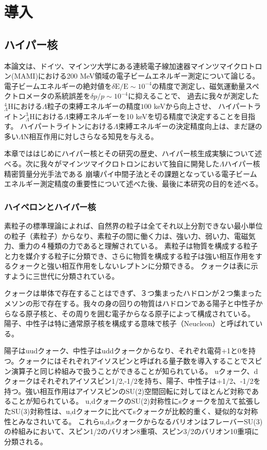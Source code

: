 \documentclass[a4paper,11pt,uplatex]{jsbook}
\begin{document}
\chapter{導入}
\section{ハイパー核}
本論文は、ドイツ、マインツ大学にある連続電子線加速器マインツマイクロトロン(MAMI)における200 MeV領域の電子ビームエネルギー測定について論じる。
電子ビームエネルギーの絶対値を$\delta \text{E}/\text{E} \sim 10^{-4}$の精度で測定し、磁気運動量スペクトロメータの系統誤差を$\delta p/p \sim 10^{-4}$に抑えることで、
過去に我々が測定した$^4_{\Lambda} \text{H}$における$\Lambda$粒子の束縛エネルギーの精度$100$ keVから向上させ、
ハイパートライトン$^3_{\Lambda}\text{H}$における$\Lambda$束縛エネルギーを10 keVを切る精度で決定することを目指す。
ハイパートライトンにおける$\Lambda$束縛エネルギーの決定精度向上は、まだ謎の多い$\Lambda$N相互作用に対しさらなる知見を与える。

本章でははじめにハイパー核とその研究の歴史、ハイパー核生成実験について述べる。次に我々がマインツマイクロトロンにおいて独自に開発した$\Lambda$ハイパー核精密質量分光手法である
崩壊パイ中間子法とその課題となっている電子ビームエネルギー測定精度の重要性について述べた後、最後に本研究の目的を述べる。

\subsection{ハイペロンとハイパー核}
素粒子の標準理論によれば、自然界の粒子は全てそれ以上分割できない最小単位の粒子（素粒子）からなり、素粒子の間に働く力は、強い力、弱い力、電磁気力、重力の４種類の力であると理解されている。
素粒子は物質を構成する粒子と力を媒介する粒子に分類でき、さらに物質を構成する粒子は強い相互作用をするクォークと強い相互作用をしないレプトンに分類できる。
クォークは表に示すように三世代に分類されている。

クォークは単体で存在することはできず、３つ集まったハドロンが２つ集まったメソンの形で存在する。我々の身の回りの物質はハドロンである陽子と中性子からなる原子核と、その周りを囲む電子からなる原子によって構成されている。
陽子、中性子は特に通常原子核を構成する意味で核子（Neucleon）と呼ばれている。

陽子はuudクォーク、中性子はuddクォークからなり、それぞれ電荷+1と0を持つ。クォークにはそれぞれアイソスピンと呼ばれる量子数を導入することでスピン演算子と同じ枠組みで扱うことができることが知られている。
uクォーク、dクォークはそれぞれアイソスピン1/2,-1/2を持ち、陽子、中性子は+1/2、-1/2を持つ。強い相互作用はアイソスピンのSU(2)空間回転に対してほとんど対称であることが知られている。
u,dクォークのSU(2)対称性にsクォークを加えて拡張したSU(3)対称性は、u,dクォークに比べてsクォークが比較的重く、疑似的な対称性とみなされいてる。
これらu,d,sクォークからなるバリオンはフレーバーSU(3)の枠組みにおいて、スピン1/2のバリオン8重項、スピン3/2のバリオン10重項に分類される。
\end{document}
